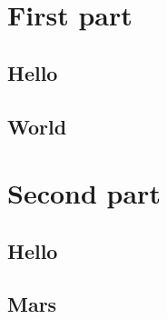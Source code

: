 \documentclass{book}
\begin{document}
\part{First part}

\chapter{Hello}
\chapter{World}

\part{Second part}

\chapter{Hello}
\chapter{Mars}
\end{document}
